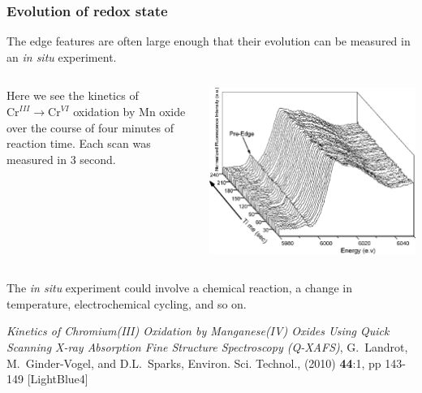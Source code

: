 \documentclass[10pt, xcolor=x11names, compress]{beamer}
\begin{document}
\begin{frame}
  \frametitle{Evolution of redox state}

  The edge features are often large enough that their evolution can be
  measured in an \textit{in situ} experiment.
  \begin{columns}
    \begin{column}{0.4\linewidth}
      Here we see the kinetics of $\mathrm{Cr}^{III}\rightarrow
      \mathrm{Cr}^{VI}$ oxidation by Mn oxide over the course of four
      minutes of reaction time.  Each scan was measured in 3 second.
    \end{column}
    
    \begin{column}{0.6\linewidth}
      \includegraphics[width=\linewidth]{images/cr_reduction.png}
    \end{column}
  \end{columns}

  The \textit{in situ} experiment could involve a chemical reaction, a
  change in temperature, electrochemical cycling, and so on.

  \begin{bottomnote}[0.5][18.5]
    \textit{Kinetics of Chromium(III) Oxidation by Manganese(IV)
      Oxides Using Quick Scanning X-ray Absorption Fine Structure
      Spectroscopy (Q-XAFS)}, G.\ Landrot, M.\ Ginder-Vogel,
    and D.L.\ Sparks, Environ. Sci. Technol., (2010) \textbf{44}:1, pp
    143-149 [LightBlue4]
  \end{bottomnote}
\end{frame}
\end{document}
